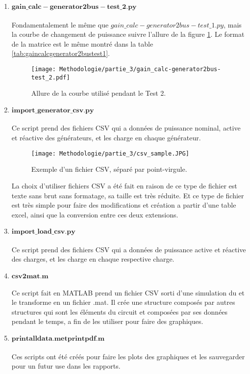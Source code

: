 \begin{enumerate}[\bfseries 5.1]
	\item $\mathbf{gain\_calc-generator2bus-test\_2.py}$\\
	\\Fondamentalement le même que $gain\_calc-generator2bus-test\_1.py$, mais la courbe de changement de puissance suivre l'allure de la figure \ref{fig:gaincalcgenerator2bustest2}. Le format de la matrice est le même montré dans la table \ref{tab:gaincalcgenerator2bustest1}.
	\begin{figure}[H]
		\begin{center}	
			\texttt{[image: Methodologie/partie\_3/gain\_calc-generator2bus-test\_2.pdf]}
			\caption{Allure de la courbe utilisé pendant le Test 2.}
			\label{fig:gaincalcgenerator2bustest2}
		\end{center}
	\end{figure}
	\item $\mathbf{import\_generator\_csv.py}$\\
	\\Ce script prend des fichiers \gls{CSV} qui a données de puissance nominal, active et réactive des générateurs, et les charge en chaque générateur.
	\begin{figure}[H]
		\begin{center}	
			\texttt{[image: Methodologie/partie\_3/csv\_sample.JPG]}
			\caption{Exemple d'un fichier CSV, séparé par point-virgule.}
			\label{fig:csv_sample}
		\end{center}
	\end{figure}
	La choix d'utiliser fichiers \gls{CSV} a été fait en raison de ce type de fichier est texte sans brut sans formatage, sa taille est très réduite. Et ce type de fichier est très simple pour faire des modifications et création a partir d'une table excel, ainsi que la conversion entre ces deux extensions.  
	\\
	\item $\mathbf{import\_load\_csv.py}$\\
	\\Ce script prend des fichiers \gls{CSV} qui a données de puissance active et réactive des charges, et les charge en chaque respective charge.
	\\
	\item $\mathbf{csv2mat.m}$\\
	\\Ce script fait en MATLAB prend un fichier \gls{CSV} sorti d'une simulation du \powerfactory et le transforme en un fichier .mat. Il crée une structure composés par autres structures qui sont les éléments du circuit et composées par ses données  pendant le temps, a fin de les utiliser pour faire des graphiques.
	\\
	\item $\mathbf{printalldata.m et printpdf.m}$\\
	\\Ces scripts ont été créés pour faire les plots des graphiques et les sauvegarder pour un futur use dans les rapports.  
\end{enumerate}
